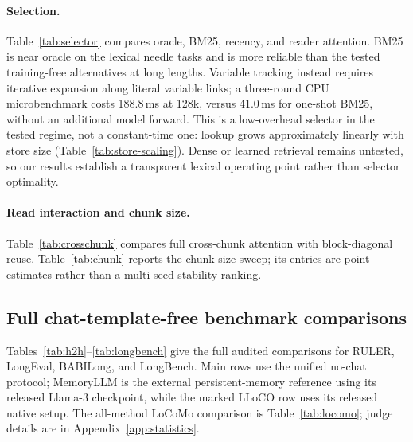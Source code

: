 






\paragraph{Selection.}
Table~\ref{tab:selector} compares oracle, BM25, recency, and reader attention.
BM25 is near oracle on the lexical needle tasks and is more reliable than the
tested training-free alternatives at long lengths. Variable tracking instead
requires iterative expansion along literal variable links; a three-round CPU
microbenchmark costs 188.8\,ms at 128k, versus 41.0\,ms for one-shot BM25, without
an additional model forward. This is a low-overhead selector in the tested
regime, not a constant-time one: lookup grows approximately linearly with store
size (Table~\ref{tab:store-scaling}). Dense or learned retrieval remains
untested, so our results establish a transparent lexical operating point rather
than selector optimality.



\paragraph{Read interaction and chunk size.}
Table~\ref{tab:crosschunk} compares full cross-chunk attention with
block-diagonal reuse. Table~\ref{tab:chunk} reports the chunk-size sweep; its
entries are point estimates rather than a multi-seed stability ranking.



\FloatBarrier
\subsection{Full chat-template-free benchmark comparisons}
\label{app:tasks}
Tables~\ref{tab:h2h}--\ref{tab:longbench} give the full audited comparisons for
RULER, LongEval, BABILong, and LongBench. Main rows use the unified no-chat
protocol; MemoryLLM is the external persistent-memory reference using its
released Llama-3 checkpoint, while the marked LLoCO row uses its released
native setup.
The all-method LoCoMo comparison is Table~\ref{tab:locomo}; judge details are in
Appendix~\ref{app:statistics}.










